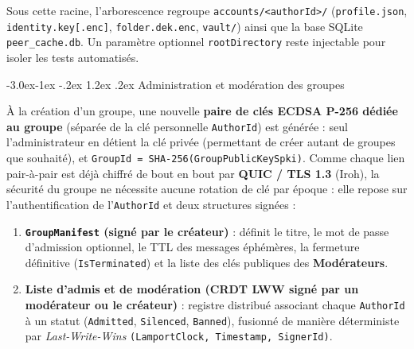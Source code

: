 \documentclass[11pt,a4paper]{article}
\makeatletter
\renewcommand\subsection{\@startsection{subsection}{2}{\z@}%
                                     {-3.0ex\@plus -1ex \@minus -.2ex}%
                                     {1.2ex \@plus .2ex}%
                                     {\normalfont\large\bfseries\color{PrimaryBlue}}}
\makeatother
\begin{document}
Sous cette racine, l'arborescence regroupe \texttt{accounts/<authorId>/} (\texttt{profile.json}, \texttt{identity.key[.enc]}, \texttt{folder.dek.enc}, \texttt{vault/}) ainsi que la base SQLite \texttt{peer\_cache.db}. Un paramètre optionnel \texttt{rootDirectory} reste injectable pour isoler les tests automatisés.

\subsection{Administration et modération des groupes}

À la création d'un groupe, une nouvelle \textbf{paire de clés ECDSA P-256 dédiée au groupe} (séparée de la clé personnelle \texttt{AuthorId}) est générée : seul l'administrateur en détient la clé privée (permettant de créer autant de groupes que souhaité), et \texttt{GroupId = SHA-256(GroupPublicKeySpki)}. Comme chaque lien pair-à-pair est déjà chiffré de bout en bout par \textbf{QUIC / TLS 1.3} (Iroh), la sécurité du groupe ne nécessite aucune rotation de clé par époque : elle repose sur l'authentification de l'\texttt{AuthorId} et deux structures signées :
\begin{enumerate}
    \item \textbf{\texttt{GroupManifest} (signé par le créateur)} : définit le titre, le mot de passe d'admission optionnel, le TTL des messages éphémères, la fermeture définitive (\texttt{IsTerminated}) et la liste des clés publiques des \textbf{Modérateurs}.
    \item \textbf{Liste d'admis et de modération (CRDT LWW signé par un modérateur ou le créateur)} : registre distribué associant chaque \texttt{AuthorId} à un statut (\texttt{Admitted}, \texttt{Silenced}, \texttt{Banned}), fusionné de manière déterministe par \emph{Last-Write-Wins} \texttt{(LamportClock, Timestamp, SignerId)}.
\end{enumerate}
\end{document}
